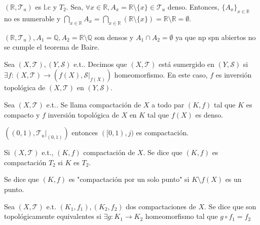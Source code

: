\begin{ejm}
  $( \mathbb{R}, \mathcal{T}_{u} )$ es l.c y $T_{2}$. Sea, $\forall x \in \mathbb{R}, A_{x} = \mathbb{R} \setminus \{ x \} \in \mathcal{T}_{u}$ denso. Entonces, $\{ A_{x} \}_{x \in \mathbb{R}}$ no es numerable y $\bigcap_{x \in \mathbb{R}} A_{x} = \bigcap_{x \in \mathbb{R}}( \mathbb{R} \setminus \{ x \}) = \mathbb{R} \setminus \mathbb{R} = \emptyset$.
\end{ejm}

\begin{ejm}
  $( \mathbb{R}, \mathcal{T}_{u} ), A_{1} = \mathbb{Q}, A_{2} = \mathbb{R} \setminus \mathbb{Q}$ son densos y $ A_{1} \cap A_{2} = \emptyset$ ya que np spn abiertos no se cumple el teorema de Baire.
\end{ejm}

\begin{defn}
  Sea $( X, \mathcal{T} ), ( Y, \mathcal{S} )$ e.t.. Decimos que $( X, \mathcal{T} )$ está sumergido en $( Y, \mathcal{S} )$ si $\exists f :  ( X, \mathcal{T} ) \to ( f(X), \mathcal{S}|_{f(X)})$ homeomorfismo. En este caso, $f$ es inversión topológica de $( X, \mathcal{T} )$ en $( Y, \mathcal{S} )$.
\end{defn}

\begin{defn}[Compactación]
  Sea $( X, \mathcal{T} )$ e.t.. Se llama compactación de $X$ a todo par $(K, f)$ tal que $ K$ es compacto y $f$ inversión topológica de $X$ en $K$ tal que $f(X)$ es denso.
\end{defn}

\begin{ejm}
  $( (0, 1), \mathcal{T}_{u}|_{(0, 1)})$ entonces $( [0, 1), j )$ es compactación.
\end{ejm}

\begin{defn}[Compactación $T_2$]
  Si $( X, \mathcal{T} )$ e.t., $( K, f )$ compactación de $X$. Se dice que $( K, f )$ es compactación $T_{2}$ si $K$ es $T_{2}$.

  Se dice que $( K, f )$ es "compactación por un solo punto" si $K \setminus f(X)$ es un punto.
\end{defn}

\begin{defn}
  Sea $( X, \mathcal{T} )$ e.t. $( K_{1}, f_{1} ), ( K_{2}, f_{2} )$ dos compactaciones de $X$. Se dice que son topológicamente equivalentes si $\exists g : K_{1} \to K_{2}$ homeomorfismo tal que $g \circ f_{1} = f_{2}$
\end{defn}

